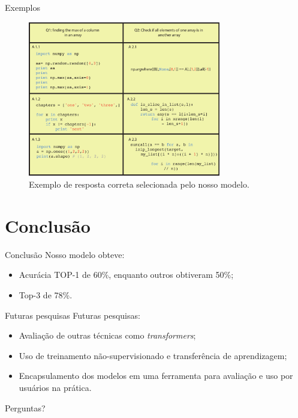 \documentclass[10pt]{beamer}
\begin{document}
\begin{frame}{Exemplos}
      \begin{figure}[h]
          \includegraphics[width=0.75\textwidth]{figuras/concrete_examples.pdf}
          \caption{Exemplo de resposta correta selecionada pelo nosso modelo.}
          
          \label{fig:concrete-examples}
        \end{figure}
    \end{frame}
    


\section{Conclusão}

\begin{frame}{Conclusão}
        Nosso modelo obteve:
        \begin{itemize}
            \item Acurácia TOP-1 de 60\%, enquanto outros obtiveram 50\%;
            \item Top-3 de 78\%.
        \end{itemize}
\end{frame}
\begin{frame}{Futuras pesquisas}
        Futuras pesquisas:
        \begin{itemize}
            \item Avaliação de outras técnicas como \textit{transformers};
            \item Uso de treinamento não-supervisionado e transferência de aprendizagem;
            \item Encapsulamento dos modelos em uma ferramenta para avaliação e uso por usuários na prática.
        \end{itemize}
    \end{frame}


{
\begin{frame}[standout]
  Perguntas?
\end{frame}
}

\appendix
\end{document}
